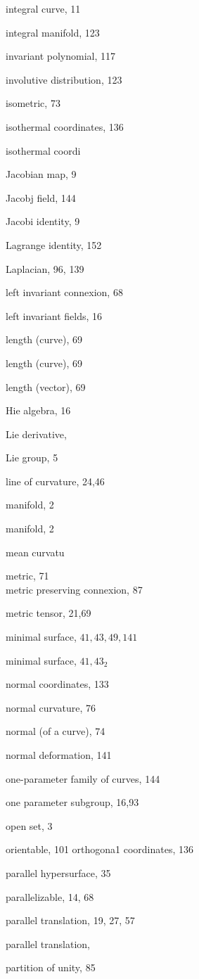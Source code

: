 \documentclass[10pt]{article}
\begin{document}
integral curve, 11

integral manifold, 123

invariant polynomial, 117

involutive distribution, 123

isometric, 73

isothermal coordinates, 136

isothermal coordi

Jacobian map, 9

Jacobj field, 144

Jacobi identity, 9

Lagrange identity, 152

Laplacian, 96, 139

left invariant connexion, 68

left invariant fields, 16

length (curve), 69

length (curve), 69

length (vector), 69

Hie algebra, 16

Lie derivative,

Lie group, 5

line of curvature, 24,46

manifold, 2

manifold, 2

mean curvatu

metric, 71\\
metric preserving connexion, 87

metric tensor, 21,69

minimal surface, $41,43,49,141$

minimal surface, $41,43_{2}$

normal coordinates, 133

normal curvature, 76

normal (of a curve), 74

normal deformation, 141

one-parameter family of curves, 144

one parameter subgroup, 16,93

open set, 3

orientable, 101
orthogona1 coordinates, 136

parallel hypersurface, 35

parallelizable, 14, 68

parallel translation, 19, 27, 57

parallel translation,

partition of unity, 85
\end{document}
